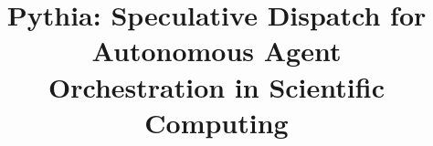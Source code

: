 \documentclass[conference,10pt]{IEEEtran}
\begin{document}
\title{Pythia: Speculative Dispatch for Autonomous Agent\\Orchestration in Scientific Computing}

\author{
}

\maketitle

\begin{abstract}


\end{abstract}
\end{document}
